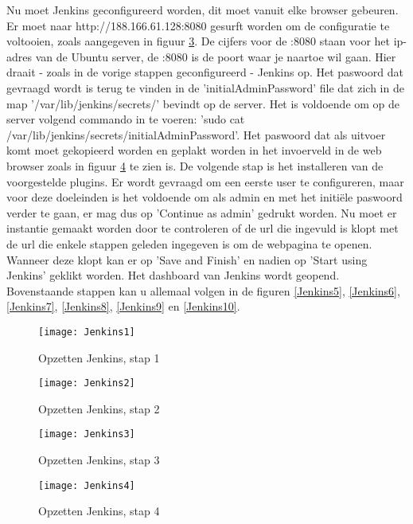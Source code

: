     Nu moet Jenkins geconfigureerd worden, dit moet vanuit elke browser gebeuren.
    Er moet naar http://188.166.61.128:8080 gesurft worden om de configuratie te voltooien, zoals aangegeven in figuur \ref{Jenkins3}. De cijfers voor de :8080 staan voor het ip-adres van de Ubuntu server, de :8080 is de poort waar je naartoe wil gaan. Hier draait - zoals in de vorige stappen geconfigureerd - Jenkins op.
    Het paswoord dat gevraagd wordt is terug te vinden in de 'initialAdminPassword' file dat zich in de map '/var/lib/jenkins/secrets/' bevindt op de server. Het is voldoende om op de server volgend commando in te voeren: 'sudo cat /var/lib/jenkins/secrets/initialAdminPassword'. Het paswoord dat als uitvoer komt moet gekopieerd worden en geplakt worden in het invoerveld in de web browser zoals in figuur \ref{Jenkins4} te zien is.
    De volgende stap is het installeren van de voorgestelde plugins. Er wordt gevraagd om een eerste user te configureren, maar voor deze doeleinden is het voldoende om als admin en met het initiële paswoord verder te gaan, er mag dus op 'Continue as admin' gedrukt worden. Nu moet er instantie gemaakt worden door te controleren of de url die ingevuld is klopt met de url die enkele stappen geleden ingegeven is om de webpagina te openen. Wanneer deze klopt kan er op 'Save and Finish' en nadien op 'Start using Jenkins' geklikt worden. Het dashboard van Jenkins wordt geopend. Bovenstaande stappen kan u allemaal volgen in de figuren \ref{Jenkins5}, \ref{Jenkins6}, \ref{Jenkins7}, \ref{Jenkins8}, \ref{Jenkins9} en \ref{Jenkins10}.
    
    \begin{figure}	
        \centering
        \texttt{[image: Jenkins1]}
        \caption{Opzetten Jenkins, stap 1} \label{Jenkins1}
    \end{figure}
    
    \begin{figure}
        \centering
        \texttt{[image: Jenkins2]}
        \caption{Opzetten Jenkins, stap 2} \label{Jenkins2}
    \end{figure}
    
    \begin{figure}	
        \centering
        \texttt{[image: Jenkins3]}
        \caption{Opzetten Jenkins, stap 3} \label{Jenkins3}
    \end{figure}
    
    \begin{figure}	
        \centering
        \texttt{[image: Jenkins4]}
        \caption{Opzetten Jenkins, stap 4} \label{Jenkins4}
    \end{figure}
    
